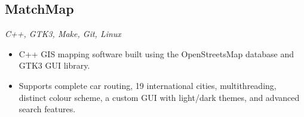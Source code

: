 \documentclass[10pt, a4paper]{article}
\begin{document}

\subsection*{MatchMap}
\textit{C++, GTK3, Make, Git, Linux}
\begin{itemize}
    \item C++ GIS mapping software built using the OpenStreetsMap database and GTK3 GUI library.
    \item Supports complete car routing, 19 international cities, multithreading, distinct colour scheme, a custom GUI with light/dark themes, and advanced search features.
\end{itemize}
\end{document}
